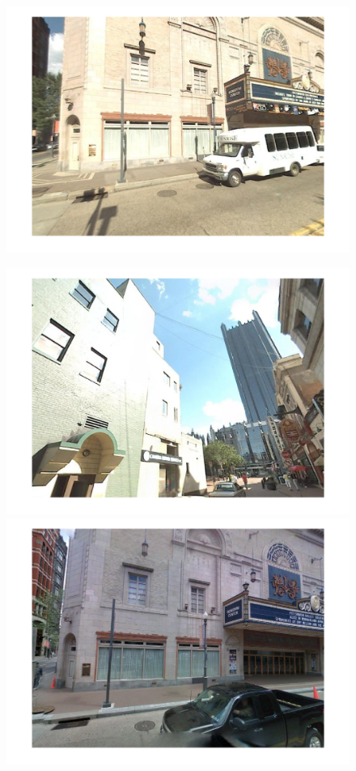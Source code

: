 \begin{figure}[!ht]
{\begin{minipage}{\subw}
{		  \includegraphics[width=1.05\linewidth]{imgs/aggrv/08aggrvQ.jpg}
		  }
		\end{minipage}
	 }
	 \hspace{3mm}
	 \colorbox{myRed}{
		\begin{minipage}{\subw}
		  \centerline{
		  \includegraphics[width=1.05\linewidth]{imgs/aggrv/08aggrvS.jpg}
		  }
		\end{minipage}
	 }
	 \colorbox{myGreen}{
		\begin{minipage}{\subw}
		  \centerline{
		  \includegraphics[width=1.05\linewidth]{imgs/aggrv/08aggrvK.jpg}
}
\end{minipage}}
\end{figure}
